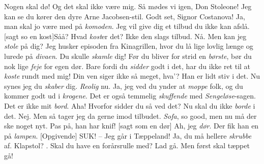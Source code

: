 \documentclass[a4paper,11pt]{article}
\begin{document}
\begin{sketch}
     Nogen skal dø! Og det skal ikke være mig. 
     Så mødes vi igen, Don Stoleone! Jeg kan se du kører den dyre Arne Jacobsen-stil.
     Godt set, Signor Costanova! Ja, man skal jo være med på \emph{komoden}. Jeg vil give dig et tilbud du ikke kan afslå.
    [sagt so en kost]Såå? Hvad \emph{kost}er det?
    Ikke den slags tilbud.
    Nå. Men kan jeg \emph{stole} på dig? Jeg husker episoden fra Kinagrillen, hvor du lå lige lovlig længe og lurede på \emph{divaen}. Du skulle \emph{skamle }dig!
    Før du bliver for strid en \emph{børste}, bør du nok lige \emph{feje} for egen dør.
    Bare fordi du \emph{sidder} godt i det, har du ikke ret til at \emph{koste} rundt med mig!
    Din ven siger ikke så meget, hva’? Han er lidt stiv i det.
    Nu synes jeg du \emph{skaber} dig.
    \emph{Reolig} nu. Ja, jeg ved du ynder at \emph{moppe} folk, og du kommer godt ud i \emph{krogene}.
    Det er også temmelig \emph{skuffende} med \emph{Sengeløse}-sagen.
    Det er ikke mit \emph{bord}.
    Aha! Hvorfor sidder du så ved det?
    Nu skal du ikke \emph{borde} i det.
    Nej. Men så tager jeg da gerne imod tilbudet.
    \emph{Sofa}, so good, men nu må der ske noget nyt.
    Pas på, han har knif!
    [sagt som en dør] Ah, jeg \emph{dør}.
    Der fik han en på \emph{lampen}.
    [Opgivende] SUK! -- Jeg går i Tæppeland!
    Ja, du må hellere \emph{skrubbe} af.
    Klapstol?
    .
    Skal du have en forårsrulle med? 
    Lad gå. Men først skal tæppet gå!


  \end{sketch}
\end{document}
